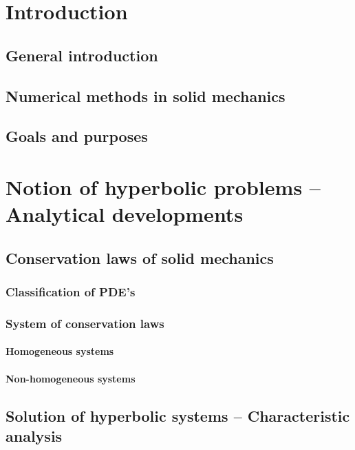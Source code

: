 \documentclass[10pt,a4paper]{report}
\author{Adrien Renaud}
\begin{document}
\tableofcontents
	\chapter{Introduction}

	    \section{General introduction}
	    \section{Numerical methods in solid mechanics}
	    \section{Goals and purposes}
                
	\chapter{Notion of hyperbolic problems -- Analytical developments }
	        
		\section{Conservation laws of solid mechanics}
	        \subsection{Classification of PDE's}
	        \subsection{System of conservation laws}
		        \subsubsection{Homogeneous systems}
		        \subsubsection{Non-homogeneous systems}
                                   
        \section{Solution of hyperbolic systems -- Characteristic analysis}
\end{document}
